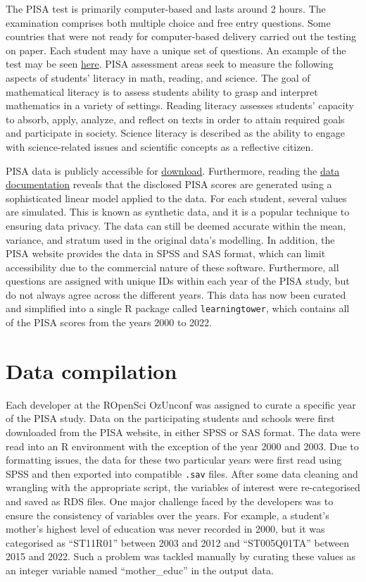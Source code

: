 The PISA test is primarily computer-based and lasts around 2 hours. The examination comprises both multiple choice and free entry questions. Some countries that were not ready for computer-based delivery carried out the testing on paper. Each student may have a unique set of questions. An example of the test may be seen \href{https://www.oecd.org/pisa/test/}{here}. PISA assessment areas seek to measure the following aspects of students' literacy in math, reading, and science. The goal of mathematical literacy is to assess students ability to grasp and interpret mathematics in a variety of settings. Reading literacy assesses students' capacity to absorb, apply, analyze, and reflect on texts in order to attain required goals and participate in society. Science literacy is described as the ability to engage with science-related issues and scientific concepts as a reflective citizen. \citep{test}

PISA data is publicly accessible for \href{https://www.oecd.org/pisa/data/}{download}. Furthermore, reading the \href{https://www.oecd.org/pisa/data/pisa2018technicalreport/Ch.09-Scaling-PISA-Data.pdf}{data documentation} reveals that the disclosed PISA scores are generated using a sophisticated linear model applied to the data. For each student, several values are simulated. \citep{scaling} This is known as synthetic data, and it is a popular technique to ensuring data privacy. The data can still be deemed accurate within the mean, variance, and stratum used in the original data's modelling. In addition, the PISA website provides the data in SPSS and SAS format, which can limit accessibility due to the commercial nature of these software. Furthermore, all questions are assigned with unique IDs within each year of the PISA study, but do not always agree across the different years. This data has now been curated and simplified into a single R package called \texttt{learningtower}, which contains all of the PISA scores from the years 2000 to 2022.

\section{Data compilation}\label{data-compilation}

Each developer at the ROpenSci OzUnconf was assigned to curate a specific year of the PISA study. Data on the participating students and schools were first downloaded from the PISA website, in either SPSS or SAS format. The data were read into an R environment with the exception of the year 2000 and 2003. Due to formatting issues, the data for these two particular years were first read using SPSS and then exported into compatible \texttt{.sav} files. After some data cleaning and wrangling with the appropriate script, the variables of interest were re-categorised and saved as RDS files. One major challenge faced by the developers was to ensure the consistency of variables over the years. For example, a student's mother's highest level of education was never recorded in 2000, but it was categorised as ``ST11R01'' between 2003 and 2012 and ``ST005Q01TA'' between 2015 and 2022. Such a problem was tackled manually by curating these values as an integer variable named ``mother\_educ'' in the output data.

